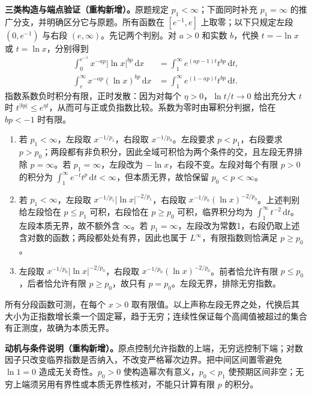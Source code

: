\documentclass[../../main.tex]{subfiles}
\begin{document}
\begin{solution}
\textbf{三类构造与端点验证（重构新增）。}原题规定 $p_1<\infty$；下面同时补充 $p_1=\infty$ 的推广分支，并明确区分它与原题。所有函数在 $[e^{-1},e]$ 上取零；以下只规定左段 $(0,e^{-1})$ 与右段 $(e,\infty)$。先记两个判别。对 $a>0$ 和实数 $b$，代换 $t=-\ln x$ 或 $t=\ln x$，分别得到
\begin{align*}
\int_0^{e^{-1}}x^{-ap}|\ln x|^{bp}\,\mathrm dx
 &=\int_1^\infty e^{(ap-1)t}t^{bp}\,\mathrm dt,\\
\int_e^\infty x^{-ap}(\ln x)^{bp}\,\mathrm dx
 &=\int_1^\infty e^{(1-ap)t}t^{bp}\,\mathrm dt.
\end{align*}
指数系数负时积分有限，正时发散：因为对每个 $\eta>0$，$\ln t/t\to0$ 给出充分大 $t$ 时 $t^{|bp|}\leqslant e^{\eta t}$，从而可与正或负指数比较。系数为零时由幂积分判据，恰在 $bp<-1$ 时有限。
\begin{enumerate}
\item 若 $p_1<\infty$，左段取 $x^{-1/p_1}$，右段取 $x^{-1/p_0}$。左段要求 $p<p_1$，右段要求 $p>p_0$；两段都有非负积分，因此全域可积恰为两个条件的交，且左段无界排除 $p=\infty$。若 $p_1=\infty$，左段改为 $-\ln x$，右段不变。左段对每个有限 $p>0$ 的积分为 $\int_1^\infty e^{-t}t^p\,\mathrm dt<\infty$，但本质无界，故恰保留 $p_0<p<\infty$。
\item 若 $p_1<\infty$，左段取
$x^{-1/p_1}|\ln x|^{-2/p_1}$，右段取
$x^{-1/p_0}(\ln x)^{-2/p_0}$。上述判别给左段恰在 $p\leqslant p_1$ 可积，右段恰在 $p\geqslant p_0$ 可积，临界积分均为 $\int_1^\infty t^{-2}\,\mathrm dt$。左段本质无界，故不额外含 $\infty$。若 $p_1=\infty$，左段改为常数1，右段仍取上述含对数的函数；两段都处处有界，因此也属于 $L^\infty$，有限指数则恰满足 $p\geqslant p_0$。
\item 左段取 $x^{-1/p_0}|\ln x|^{-2/p_0}$，右段取 $x^{-1/p_0}(\ln x)^{-2/p_0}$。前者恰允许有限 $p\leqslant p_0$，后者恰允许有限 $p\geqslant p_0$，故只有 $p=p_0$。左段无界，排除无穷指数。
\end{enumerate}
所有分段函数可测，在每个 $x>0$ 取有限值。以上声称左段无界之处，代换后其大小为正指数增长乘一个固定幂，趋于无穷；连续性保证每个高阈值被超过的集合有正测度，故确为本质无界。
\end{solution}
\begin{remark}
\textbf{动机与条件说明（重构新增）。}原点控制允许指数的上端，无穷远控制下端；对数因子只改变临界指数是否纳入，不改变严格幂次边界。把中间区间置零避免 $\ln1=0$ 造成无关奇性。$p_0>0$ 使构造幂次有意义，$p_0<p_1$ 使预期区间非空；无穷上端须另用有界性或本质无界性核对，不能只计算有限 $p$ 的积分。
\end{remark}
\end{document}
